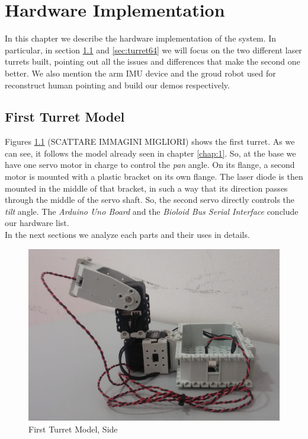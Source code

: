 \chapter{Hardware Implementation}
\label{chap:2}
In this chapter we describe the hardware implementation of the system. In particular, in section \ref{sec:turret12} and \ref{sec:turret64} we will focus on the two different laser turrets built, pointing out all the issues and differences that make the second one better. We also mention the arm IMU device and the groud robot used for reconstruct human pointing and build our demos respectively.
\section{First Turret Model} \label{sec:turret12}
Figures \ref{fig:firstModelSide} (SCATTARE IMMAGINI MIGLIORI) shows the first turret. As we can see, it follows the model already seen in chapter \ref{chap:1}. So, at the base we have one servo motor in charge to control the \emph{pan} angle. On its flange, a second motor is mounted with a plastic bracket on its own flange. The laser diode is then mounted in the middle of that bracket, in such a way that its direction passes through the middle of the servo shaft. So, the second servo directly controls the \emph{tilt} angle. 
The \emph{Arduino Uno Board} and the \emph{Bioloid Bus Serial Interface} conclude our hardware list.
\\In the next sections we analyze each parts and their uses in details.
\begin{figure}
	\centering
	\includegraphics[width=\textwidth]{img/firstModelSide.png}%
	\caption{First Turret Model, Side}
	\label{fig:firstModelSide}
\end{figure}
